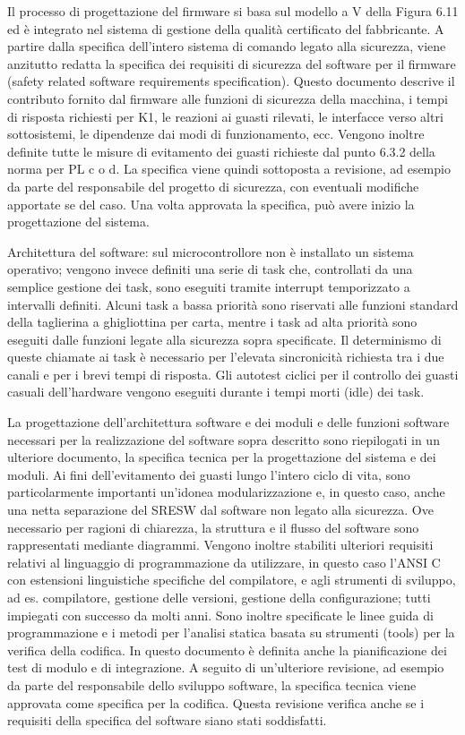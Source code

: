 Il processo di progettazione del firmware si basa sul modello a V della Figura 6.11 ed è integrato nel sistema di gestione della qualità certificato del fabbricante. A partire dalla specifica dell'intero sistema di comando legato alla sicurezza, viene anzitutto redatta la specifica dei requisiti di sicurezza del software per il firmware (safety related software requirements specification). Questo documento descrive il contributo fornito dal firmware alle funzioni di sicurezza della macchina, i tempi di risposta richiesti per K1, le reazioni ai guasti rilevati, le interfacce verso altri sottosistemi, le dipendenze dai modi di funzionamento, ecc. Vengono inoltre definite tutte le misure di evitamento dei guasti richieste dal punto 6.3.2 della norma per PL c o d. La specifica viene quindi sottoposta a revisione, ad esempio da parte del responsabile del progetto di sicurezza, con eventuali modifiche apportate se del caso. Una volta approvata la specifica, può avere inizio la progettazione del sistema.

Architettura del software: sul microcontrollore non è installato un sistema operativo; vengono invece definiti una serie di task che, controllati da una semplice gestione dei task, sono eseguiti tramite interrupt temporizzato a intervalli definiti. Alcuni task a bassa priorità sono riservati alle funzioni standard della taglierina a ghigliottina per carta, mentre i task ad alta priorità sono eseguiti dalle funzioni legate alla sicurezza sopra specificate. Il determinismo di queste chiamate ai task è necessario per l'elevata sincronicità richiesta tra i due canali e per i brevi tempi di risposta. Gli autotest ciclici per il controllo dei guasti casuali dell'hardware vengono eseguiti durante i tempi morti (idle) dei task.

La progettazione dell'architettura software e dei moduli e delle funzioni software necessari per la realizzazione del software sopra descritto sono riepilogati in un ulteriore documento, la specifica tecnica per la progettazione del sistema e dei moduli. Ai fini dell'evitamento dei guasti lungo l'intero ciclo di vita, sono particolarmente importanti un'idonea modularizzazione e, in questo caso, anche una netta separazione del SRESW dal software non legato alla sicurezza. Ove necessario per ragioni di chiarezza, la struttura e il flusso del software sono rappresentati mediante diagrammi. Vengono inoltre stabiliti ulteriori requisiti relativi al linguaggio di programmazione da utilizzare, in questo caso l'ANSI C con estensioni linguistiche specifiche del compilatore, e agli strumenti di sviluppo, ad es. compilatore, gestione delle versioni, gestione della configurazione; tutti impiegati con successo da molti anni. Sono inoltre specificate le linee guida di programmazione e i metodi per l'analisi statica basata su strumenti (tools) per la verifica della codifica. In questo documento è definita anche la pianificazione dei test di modulo e di integrazione. A seguito di un'ulteriore revisione, ad esempio da parte del responsabile dello sviluppo software, la specifica tecnica viene approvata come specifica per la codifica. Questa revisione verifica anche se i requisiti della specifica del software siano stati soddisfatti.

